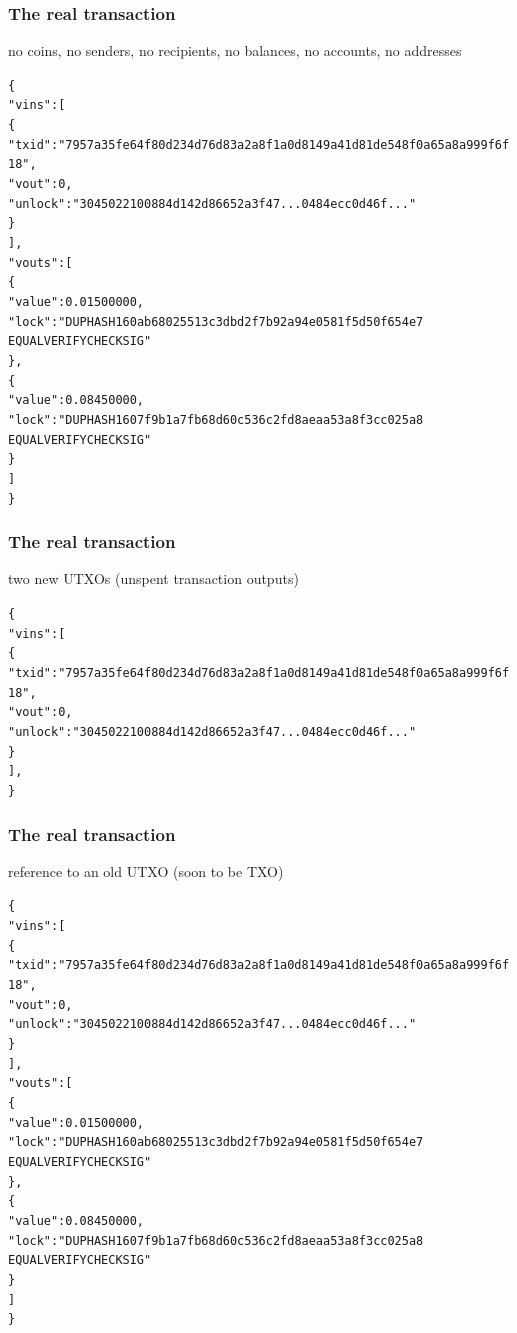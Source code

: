 \documentclass[11pt]{beamer}  %
\begin{document}
\begin{frame}[fragile]\frametitle{The real transaction}

  \begin{center}
    no coins, no senders, no recipients, no balances, no accounts, no addresses
  \end{center}

  {\scriptsize\begin{alltt}
\{
  "vins": [
    \{
      "txid": "7957a35fe64f80d234d76d83a2a8f1a0d8149a41d81de548f0a65a8a999f6f18",
      "vout": 0,
      "unlock": "3045022100884d142d86652a3f47... 0484ecc0d46f..."
    \}
  ],
  "vouts": [
    \{
      "value": 0.01500000,
      "lock": "DUP HASH160 ab68025513c3dbd2f7b92a94e0581f5d50f654e7 
               EQUALVERIFY CHECKSIG"
    \},
    \{
      "value": 0.08450000,
      "lock": "DUP HASH160 7f9b1a7fb68d60c536c2fd8aeaa53a8f3cc025a8
               EQUALVERIFY CHECKSIG"
    \}
  ]
\}
\end{alltt}}

\end{frame}

\begin{frame}[fragile]\frametitle{The real transaction}

  \begin{center}
    two new UTXOs (unspent transaction outputs)
  \end{center}

  {\scriptsize\begin{alltt}
\{
  "vins": [
    \{
      "txid": "7957a35fe64f80d234d76d83a2a8f1a0d8149a41d81de548f0a65a8a999f6f18",
      "vout": 0,
      "unlock": "3045022100884d142d86652a3f47... 0484ecc0d46f..."
    \}
  ],
\}
\end{alltt}}

\end{frame}

\begin{frame}[fragile]\frametitle{The real transaction}

  \begin{center}
    reference to an old UTXO (soon to be TXO)
  \end{center}

  {\scriptsize\begin{alltt}
\{
  \alert{"vins": [
    \{
      "txid": "7957a35fe64f80d234d76d83a2a8f1a0d8149a41d81de548f0a65a8a999f6f18",
      "vout": 0,
      "unlock": "3045022100884d142d86652a3f47... 0484ecc0d46f..."
    \}
  ]},
  "vouts": [
    \{
      "value": 0.01500000,
      "lock": "DUP HASH160 ab68025513c3dbd2f7b92a94e0581f5d50f654e7
               EQUALVERIFY CHECKSIG"
    \},
    \{
      "value": 0.08450000,
      "lock": "DUP HASH160 7f9b1a7fb68d60c536c2fd8aeaa53a8f3cc025a8
               EQUALVERIFY CHECKSIG"
    \}
  ]
\}
\end{alltt}}

\end{frame}
\end{document}
